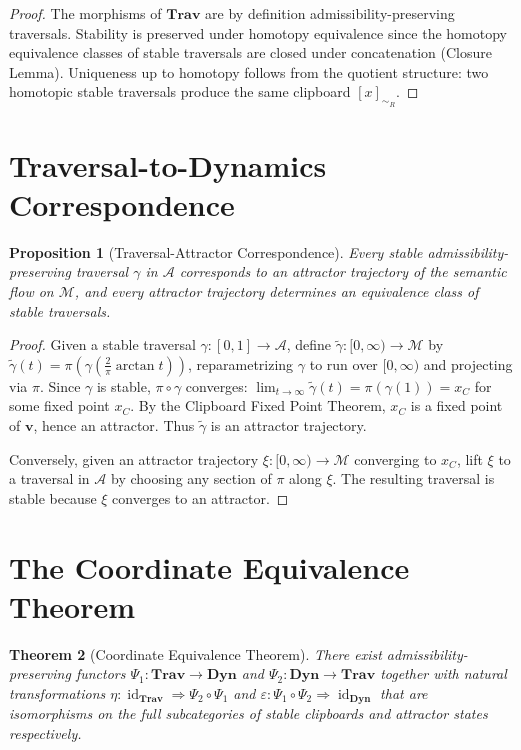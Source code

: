 \documentclass[12pt,oneside]{book}
\theoremstyle{plain}
\newtheorem{theorem}{Theorem}[chapter]
\newtheorem{proposition}[theorem]{Proposition}
\theoremstyle{definition}
\theoremstyle{plain}
\DeclareMathOperator{\id}{id}
\newcommand{\Trav}{\mathbf{Trav}}
\newcommand{\cA}{\mathcal{A}}
\newcommand{\cM}{\mathcal{M}}
\begin{document}
\begin{proof}
The morphisms of $\Trav$ are by definition admissibility-preserving traversals. Stability is preserved under homotopy equivalence since the homotopy equivalence classes of stable traversals are closed under concatenation (Closure Lemma). Uniqueness up to homotopy follows from the quotient structure: two homotopic stable traversals produce the same clipboard $[x]_{\sim_R}$.
\end{proof}

\section{Traversal-to-Dynamics Correspondence}

\begin{proposition}[Traversal-Attractor Correspondence]
Every stable admissibility-preserving traversal $\gamma$ in $\cA$ corresponds to an attractor trajectory of the semantic flow on $\cM$, and every attractor trajectory determines an equivalence class of stable traversals.
\end{proposition}

\begin{proof}
Given a stable traversal $\gamma : [0,1] \to \cA$, define $\tilde\gamma : [0,\infty) \to \cM$ by $\tilde\gamma(t) = \pi(\gamma(\frac{2}{\pi}\arctan t))$, reparametrizing $\gamma$ to run over $[0,\infty)$ and projecting via $\pi$. Since $\gamma$ is stable, $\pi \circ \gamma$ converges: $\lim_{t\to\infty}\tilde\gamma(t) = \pi(\gamma(1)) = x_C$ for some fixed point $x_C$. By the Clipboard Fixed Point Theorem, $x_C$ is a fixed point of $\mathbf{v}$, hence an attractor. Thus $\tilde\gamma$ is an attractor trajectory.

Conversely, given an attractor trajectory $\xi : [0,\infty) \to \cM$ converging to $x_C$, lift $\xi$ to a traversal in $\cA$ by choosing any section of $\pi$ along $\xi$. The resulting traversal is stable because $\xi$ converges to an attractor.
\end{proof}

\section{The Coordinate Equivalence Theorem}

\begin{theorem}[Coordinate Equivalence Theorem]
There exist admissibility-preserving functors $\Psi_1 : \Trav \to \mathbf{Dyn}$ and $\Psi_2 : \mathbf{Dyn} \to \Trav$ together with natural transformations $\eta : \id_{\Trav} \Rightarrow \Psi_2 \circ \Psi_1$ and $\varepsilon : \Psi_1 \circ \Psi_2 \Rightarrow \id_{\mathbf{Dyn}}$ that are isomorphisms on the full subcategories of stable clipboards and attractor states respectively.
\end{theorem}
\end{document}
